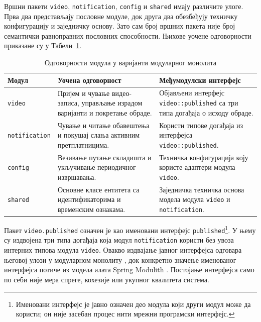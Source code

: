 \documentclass[12pt,oneside]{memoir}
\begin{document}
Вршни пакети \texttt{video}, \texttt{notifi\allowbreak cation}, \texttt{config} и
\texttt{shared} имају различите улоге. Прва два представљају пословне модуле,
док друга два обезбеђују техничку конфигурацију и заједничку основу. Зато сам
број вршних пакета није број семантички равноправних пословних способности.
Њихове уочене одговорности приказане су у
Табели~\ref{tab:modularni-monolit-moduli}.

\begin{table}[!ht]
	\centering
	\small
	\begin{tabular}{|>{\raggedright\arraybackslash}p{}|>{\raggedright\arraybackslash}p{}|>{\raggedright\arraybackslash}p{}|}
		\hline
		\textbf{Модул} & \textbf{Уочена одговорност} & \textbf{Међумодулски интерфејс} \\
		\hline
		\texttt{video} & Пријем и чување видео-записа, управљање израдом варијанти и покретање обраде. & Објављени интерфејс \texttt{video::published} са три типа догађаја о исходу обраде. \\
		\hline
		\texttt{notifi\allowbreak cation} & Чување и читање обавештења и покушај слања активним претплатницима. & Користи типове догађаја из интерфејса \texttt{video::published}. \\
		\hline
		\texttt{config} & Везивање путање складишта и укључивање периодичног извршавања. & Техничка конфигурација коју користе адаптери модула \texttt{video}. \\
		\hline
		\texttt{shared} & Основне класе ентитета са идентификаторима и временским ознакама. & Заједничка техничка основа модела модула \texttt{video} и \texttt{notifi\allowbreak cation}. \\
		\hline
	\end{tabular}
	\caption{Одговорности модула у варијанти модуларног монолита}
	\label{tab:modularni-monolit-moduli}
\end{table}


Пакет \texttt{video.published} означен је као именовани интерфејс
\texttt{published}\footnote{Именовани интерфејс је јавно означен део модула
	који други модул може да користи; он није засебан процес нити мрежни
	програмски интерфејс.}. У њему су издвојена три типа догађаја која модул
\texttt{notifi\allowbreak cation} користи без увоза интерних типова модула \texttt{video}.
Овакво издвајање јавног интерфејса одговара његовој улози у модуларном
монолиту \cite{su2024modularMonolith}, док конкретно значење именованог
интерфејса потиче из модела алата {\lat Spring Modulith}
\cite{springModulith2026fundamentals}. Постојање интерфејса само по себи није
мера спреге, кохезије или укупног квалитета система.
\end{document}
